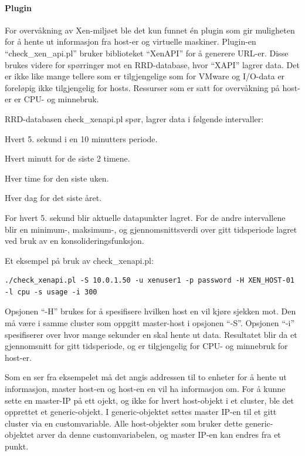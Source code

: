 \paragraph{Plugin}
For overvåkning av Xen-miljøet ble det kun funnet én plugin som gir muligheten for å hente ut informasjon fra host-er og virtuelle maskiner. Plugin-en ``check\_xen\_api.pl'' bruker biblioteket ``XenAPI'' for å generere URL-er. Disse brukes videre for spørringer mot en RRD-database, hvor ``XAPI'' lagrer data\cite{xenwiki}. Det er ikke like mange tellere som er tilgjengelige som for VMware og I/O-data er foreløpig ikke tilgjengelig for hosts. Ressurser som er satt for overvåkning på host-er er CPU- og minnebruk.

RRD-databasen check\_xenapi.pl spør, lagrer data i følgende intervaller:
\begin{enumerate*}
        \item Hvert 5. sekund i en 10 minutters periode.
        \item Hvert minutt for de siste 2 timene.
        \item Hver time for den siste uken.
        \item Hver dag for det siste året.
\end{enumerate*}

For hvert 5. sekund blir aktuelle datapunkter lagret. For de andre intervallene blir en minimum-, maksimum-, og gjennomsnittsverdi over gitt tidsperiode lagret ved bruk av en konsolideringsfunksjon. \cite{xenrrd}

Et eksempel på bruk av check\_xenapi.pl: 
\begin{lstlisting}[style=example]
./check_xenapi.pl -S 10.0.1.50 -u xenuser1 -p password -H XEN_HOST-01 -l cpu -s usage -i 300
\end{lstlisting}

Opsjonen ``-H'' brukes for å spesifisere hvilken host en vil kjøre sjekken mot. Den må være i samme cluster som oppgitt master-host i opsjonen ``-S''. Opsjonen ``-i'' spesifiserer over hvor mange sekunder en skal hente ut data. Resultatet blir da et gjennomsnitt for gitt tidsperiode, og er tilgjengelig for CPU- og minnebruk for host-er.

Som en ser fra eksempelet må det angis addressen til to enheter for å hente ut informasjon, master host-en og host-en en vil ha informasjon om. For å kunne sette en master-IP på ett ojekt, og ikke for hvert host-objekt i et cluster, ble det opprettet et generic-objekt. I generic-objektet settes master IP-en til et gitt cluster via en customvariable. Alle host-objekter som bruker dette generic-objektet arver da denne customvariabelen, og master IP-en kan endres fra et punkt.


